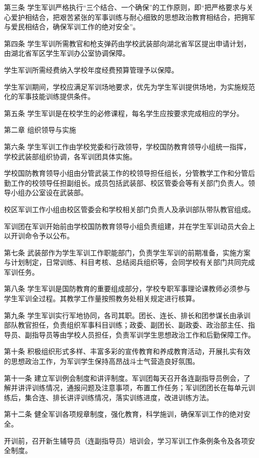 \documentclass[UTF8,12pt,a4paper]{report}
\begin{document}
第三条 学生军训严格执行“三个结合、一个确保”的工作原则，即“把严格要求与关心爱护相结合，把艰苦紧张的军事训练与耐心细致的思想政治教育相结合，把拥军与爱民相结合，确保军训工作的绝对安全”。

第四条 学生军训所需教官和枪支弹药由学校武装部向湖北省军区提出申请计划，由湖北省军区学生军训办公室协调保障。

学生军训所需经费纳入学校年度经费预算管理予以保障。

学生军训期间，学校应满足军训场地要求，优先为学生军训提供场地，为实施规范化的军事技能训练提供条件。

第五条 学生军训是在校学生的必修课程，每名学生应按要求完成相应的学分。

第二章 组织领导与实施

第六条 学生军训工作由学校党委和行政领导，学校国防教育领导小组统一指挥，学校武装部组织协调，各军训团具体实施。

学校国防教育领导小组由分管武装工作的校领导担任组长，分管教学工作和分管后勤工作的校领导任担副组长。成员包括武装部、校区管委会等有关部门负责人。领导小组办公室设在武装部。

校区军训工作小组由校区管委会和学校相关部门负责人及承训部队带队教官组成。

军训团在军训开始前由学校国防教育领导小组负责组建，并在学生军训动员大会上以开训命令予以公布。

第七条 武装部作为学生军训工作职能部门，负责学生军训的前期准备，实施方案与计划制定，日常训练、科目考核、总结阅兵组织等，会同学校有关部门共同完成军训任务。

第八条 学生军训是国防教育的重要组成部分，学校专职军事理论课教师必须参与学生军训全过程。其教学工作量按照教务处相关规定进行核算。

第九条 学生军训实行军地协同，各司其职。团长、连长、排长和团参谋长由承训部队教官担任，负责组织军事科目训练；政委、副团长、副政委、政治部主任、指导员、副指导员等由学校人员担任，负责军训学生思想政治工作和后勤保障工作。

第十条 积极组织形式多样、丰富多彩的宣传教育和养成教育活动，开展扎实有效的思想政治工作，为军训学生保持高昂战斗士气营造良好氛围。

第十一条 建立军训例会制度和讲评制度。军训团每天召开各连副指导员例会，了解并讲评训练情况，通报问题及注意事项，布置工作任务；军训团团长在每单元训练后，集合连、排长讲评训练情况，落实训练进度，改进训练方法。

第十二条 健全军训各项规章制度，强化教育，科学施训，确保军训工作的绝对安全。

开训前，召开新生辅导员（连副指导员）培训会，学习军训工作条例条令及各项安全制度。
\end{document}
